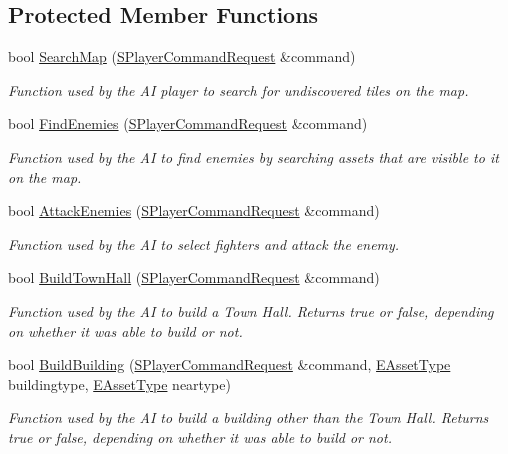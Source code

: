 \subsection*{Protected Member Functions}
\begin{DoxyCompactItemize}
\item 
bool \hyperlink{classCAIPlayer_afafbe8fc589e09a16ae1f02f2794d7b0}{Search\+Map} (\hyperlink{structSPlayerCommandRequest}{S\+Player\+Command\+Request} \&command)
\begin{DoxyCompactList}\small\item\em Function used by the AI player to search for undiscovered tiles on the map. \end{DoxyCompactList}\item 
bool \hyperlink{classCAIPlayer_a33b1533570e7a00114d1b85b3551e395}{Find\+Enemies} (\hyperlink{structSPlayerCommandRequest}{S\+Player\+Command\+Request} \&command)
\begin{DoxyCompactList}\small\item\em Function used by the AI to find enemies by searching assets that are visible to it on the map. \end{DoxyCompactList}\item 
bool \hyperlink{classCAIPlayer_adf7feeba7debf9f19b000887616d7bfb}{Attack\+Enemies} (\hyperlink{structSPlayerCommandRequest}{S\+Player\+Command\+Request} \&command)
\begin{DoxyCompactList}\small\item\em Function used by the AI to select fighters and attack the enemy. \end{DoxyCompactList}\item 
bool \hyperlink{classCAIPlayer_a41cdefbe14210fb70b793a32778c5141}{Build\+Town\+Hall} (\hyperlink{structSPlayerCommandRequest}{S\+Player\+Command\+Request} \&command)
\begin{DoxyCompactList}\small\item\em Function used by the AI to build a Town Hall. Returns true or false, depending on whether it was able to build or not. \end{DoxyCompactList}\item 
bool \hyperlink{classCAIPlayer_a2ff5263cbaa6bfc62ffec4dbce87ba88}{Build\+Building} (\hyperlink{structSPlayerCommandRequest}{S\+Player\+Command\+Request} \&command, \hyperlink{GameDataTypes_8h_a5600d4fc433b83300308921974477fec}{E\+Asset\+Type} buildingtype, \hyperlink{GameDataTypes_8h_a5600d4fc433b83300308921974477fec}{E\+Asset\+Type} neartype)
\begin{DoxyCompactList}\small\item\em Function used by the AI to build a building other than the Town Hall. Returns true or false, depending on whether it was able to build or not. \end{DoxyCompactList}\item 

\end{DoxyCompactItemize}
